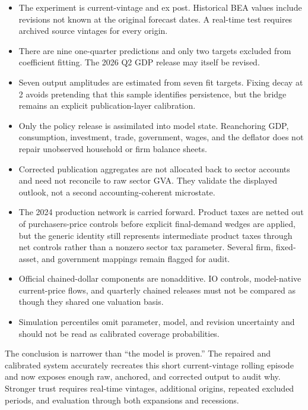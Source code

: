 \documentclass[10pt]{article}
\begin{document}
\begin{cautionbox}[title={Limitations that matter}]
\begin{itemize}
\item The experiment is current-vintage and ex post. Historical BEA values
include revisions not known at the original forecast dates. A real-time test
requires archived source vintages for every origin.
\item There are nine one-quarter predictions and only two targets excluded
from coefficient fitting. The 2026 Q2 GDP release may itself be revised.
\item Seven output amplitudes are estimated from seven fit targets. Fixing
decay at 2 avoids pretending that this sample identifies persistence, but the
bridge remains an explicit publication-layer calibration.
\item Only the policy release is assimilated into model state. Reanchoring GDP,
consumption, investment, trade, government, wages, and the deflator does not
repair unobserved household or firm balance sheets.
\item Corrected publication aggregates are not allocated back to sector
accounts and need not reconcile to raw sector GVA. They validate the displayed
outlook, not a second accounting-coherent microstate.
\item The 2024 production network is carried forward. Product taxes are netted
out of purchasers-price controls before explicit final-demand wedges are
applied, but the generic identity still represents intermediate product taxes
through net controls rather than a nonzero sector tax parameter. Several firm,
fixed-asset, and government mappings remain flagged for audit.
\item Official chained-dollar components are nonadditive. IO controls,
model-native current-price flows, and quarterly chained releases must not be
compared as though they shared one valuation basis.
\item Simulation percentiles omit parameter, model, and revision uncertainty
and should not be read as calibrated coverage probabilities.
\end{itemize}
\end{cautionbox}

The conclusion is narrower than ``the model is proven.'' The repaired and
calibrated system accurately recreates this short current-vintage rolling
episode and now exposes enough raw, anchored, and corrected output to audit
why. Stronger trust requires real-time vintages, additional origins, repeated
excluded periods, and evaluation through both expansions and recessions.
\end{document}
